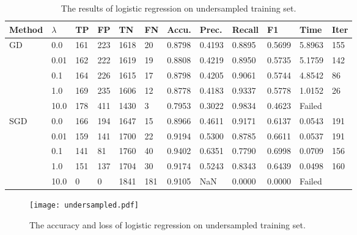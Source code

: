 \begin{table}[H]
    \centering
    \caption{The results of logistic regression on undersampled training set.}
    \label{tab:lr-2}
    \begin{tabular}{llllllllllll}
        \toprule
        Method               & $\lambda$ & TP  & FP  & TN   & FN  & Accu.  & Prec.  & Recall & F1     & Time   & Iter \\
        \midrule
        \multirow{5}{*}{GD}  & 0.0       & 161 & 223 & 1618 & 20  & 0.8798 & 0.4193 & 0.8895 & 0.5699 & 5.8963 & 155  \\
                             & 0.01      & 162 & 222 & 1619 & 19  & 0.8808 & 0.4219 & 0.8950 & 0.5735 & 5.1759 & 142  \\
                             & 0.1       & 164 & 226 & 1615 & 17  & 0.8798 & 0.4205 & 0.9061 & 0.5744 & 4.8542 & 86   \\
                             & 1.0       & 169 & 235 & 1606 & 12  & 0.8778 & 0.4183 & 0.9337 & 0.5778 & 1.0152 & 26   \\
                             & 10.0      & 178 & 411 & 1430 & 3   & 0.7953 & 0.3022 & 0.9834 & 0.4623 & Failed &      \\
        \midrule
        \multirow{5}{*}{SGD} & 0.0       & 166 & 194 & 1647 & 15  & 0.8966 & 0.4611 & 0.9171 & 0.6137 & 0.0543 & 191  \\
                             & 0.01      & 159 & 141 & 1700 & 22  & 0.9194 & 0.5300 & 0.8785 & 0.6611 & 0.0537 & 191  \\
                             & 0.1       & 141 & 81  & 1760 & 40  & 0.9402 & 0.6351 & 0.7790 & 0.6998 & 0.0709 & 156  \\
                             & 1.0       & 151 & 137 & 1704 & 30  & 0.9174 & 0.5243 & 0.8343 & 0.6439 & 0.0498 & 160  \\
                             & 10.0      & 0   & 0   & 1841 & 181 & 0.9105 & NaN    & 0.0000 & 0.0000 & Failed &      \\
        \bottomrule
    \end{tabular}
\end{table}
\begin{figure}[H]
    \centering
    \texttt{[image: undersampled.pdf]}
    \caption{The accuracy and loss of logistic regression on undersampled training set.}
    \label{fig:lr-2}
\end{figure}

